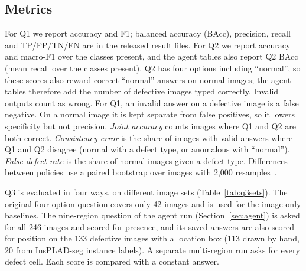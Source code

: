 \documentclass[11pt]{article}
\begin{document}
\subsection{Metrics}
For Q1 we report accuracy and F1; balanced accuracy (BAcc), precision, recall and TP/FP/TN/FN are in the released result files. For Q2 we report accuracy and macro-F1 over the classes present, and the agent tables also report Q2 BAcc (mean recall over the classes present). Q2 has four options including ``normal'', so these scores also reward correct ``normal'' answers on normal images; the agent tables therefore add the number of defective images typed correctly. Invalid outputs count as wrong. For Q1, an invalid answer on a defective image is a false negative. On a normal image it is kept separate from false positives, so it lowers specificity but not precision. \emph{Joint accuracy} counts images where Q1 and Q2 are both correct. \emph{Consistency error} is the share of images with valid answers where Q1 and Q2 disagree (normal with a defect type, or anomalous with ``normal''). \emph{False defect rate} is the share of normal images given a defect type. Differences between policies use a paired bootstrap over images with 2,000 resamples~\cite{efron1994bootstrap}.

Q3 is evaluated in four ways, on different image sets (Table~\ref{tab:q3sets}). The original four-option question covers only 42 images and is used for the image-only baselines. The nine-region question of the agent run (Section~\ref{sec:agent}) is asked for all 246 images and scored for presence, and its saved answers are also scored for position on the 133 defective images with a location box (113 drawn by hand, 20 from InsPLAD-seg instance labels). A separate multi-region run asks for every defect cell. Each score is compared with a constant answer.
\end{document}
